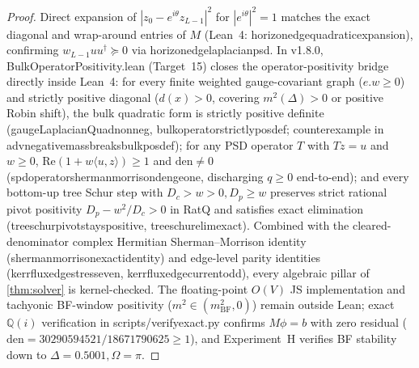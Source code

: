 \documentclass[11pt,a4paper]{article}
\numberwithin{equation}{section}
\theoremstyle{plain}
\theoremstyle{definition}
\theoremstyle{remark}
\newcommand{\Q}{\mathbb{Q}}
\newcommand{\code}[1]{{\ttfamily\footnotesize\def\_{\textunderscore\penalty0\hskip0pt}#1}}
\begin{document}
\begin{proof}
Direct expansion of $|z_0 - e^{i\theta}z_{L-1}|^2$ for $|e^{i\theta}|^2 = 1$ matches the exact diagonal and wrap-around entries of $M$ (Lean~4: \code{horizon\_\allowbreak edge\_\allowbreak quadratic\_\allowbreak expansion}), confirming $w_{L-1} u u^\dagger \succeq 0$ via \code{horizon\_\allowbreak edge\_\allowbreak laplacian\_\allowbreak psd}. In \code{v1.8.0}, \code{Bulk\allowbreak Operator\allowbreak Positivity.\allowbreak lean} (Target~15) closes the operator-positivity bridge directly inside Lean~4: for every finite weighted gauge-covariant graph ($e.w \ge 0$) and strictly positive diagonal ($d(x) > 0$, covering $m^2(\Delta) > 0$ or positive Robin shift), the bulk quadratic form is strictly positive definite (\code{gauge\allowbreak Laplacian\allowbreak Quad\_\allowbreak nonneg}, \code{bulk\_\allowbreak operator\_\allowbreak strictly\_\allowbreak pos\_\allowbreak def}; counterexample in \code{adv\_\allowbreak negative\_\allowbreak mass\_\allowbreak breaks\_\allowbreak bulk\_\allowbreak pos\_\allowbreak def}); for any PSD operator $T$ with $T z = u$ and $w \ge 0$, $\mathrm{Re}(1 + w\langle u, z\rangle) \ge 1$ and $\mathrm{den} \ne 0$ (\code{spd\_\allowbreak operator\_\allowbreak sherman\_\allowbreak morrison\_\allowbreak den\_\allowbreak ge\_\allowbreak one}, discharging $q \ge 0$ end-to-end); and every bottom-up tree Schur step with $D_c > w > 0, D_p \ge w$ preserves strict rational pivot positivity $D_p - w^2/D_c > 0$ in \code{RatQ} and satisfies exact elimination (\code{tree\_\allowbreak schur\_\allowbreak pivot\_\allowbreak stays\_\allowbreak positive}, \code{tree\_\allowbreak schur\_\allowbreak elim\_\allowbreak exact}). Combined with the cleared-denominator complex Hermitian Sherman--Morrison identity~\cite{ShermanMorrison1950} (\code{sherman\_\allowbreak morrison\_\allowbreak exact\_\allowbreak identity}) and edge-level parity identities (\code{kerr\_\allowbreak flux\_\allowbreak edge\_\allowbreak stress\_\allowbreak even}, \code{kerr\_\allowbreak flux\_\allowbreak edge\_\allowbreak current\_\allowbreak odd}), every algebraic pillar of \cref{thm:solver} is kernel-checked. The floating-point $O(V)$ JS implementation and tachyonic BF-window positivity ($m^2 \in (m_{\mathrm{BF}}^2, 0)$) remain outside Lean; exact $\Q(i)$ verification in \code{scripts/\allowbreak verify\_\allowbreak exact.\allowbreak py} confirms $M\phi = b$ with zero residual ($\mathrm{den} = 30290594521/\allowbreak 18671790625 \ge 1$), and Experiment~H verifies BF stability down to $\Delta = 0.5001, \Omega = \pi$.
\end{proof}
\end{document}
